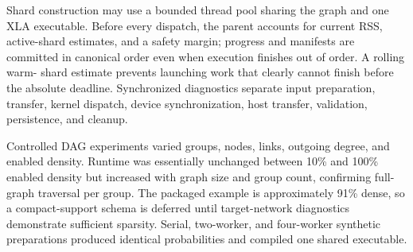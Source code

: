 Shard construction may use a bounded thread pool sharing the graph and one XLA
executable. Before every dispatch, the parent accounts for current RSS,
active-shard estimates, and a safety margin; progress and manifests are committed
in canonical order even when execution finishes out of order. A rolling warm-
shard estimate prevents launching work that clearly cannot finish before the
absolute deadline. Synchronized diagnostics separate input preparation,
transfer, kernel dispatch, device synchronization, host transfer, validation,
persistence, and cleanup.

Controlled DAG experiments varied groups, nodes, links, outgoing degree, and
enabled density. Runtime was essentially unchanged between 10\% and 100\%
enabled density but increased with graph size and group count, confirming
full-graph traversal per group. The packaged example is approximately 91\%
dense, so a compact-support schema is deferred until target-network diagnostics
demonstrate sufficient sparsity. Serial, two-worker, and four-worker synthetic
preparations produced identical probabilities and compiled one shared
executable.
